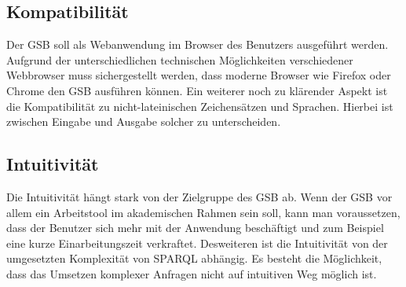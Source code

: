 \subsection{Kompatibilität}
Der GSB soll als Webanwendung im Browser des Benutzers ausgeführt werden. Aufgrund der unterschiedlichen technischen Möglichkeiten verschiedener Webbrowser muss sichergestellt werden, dass moderne Browser wie Firefox oder Chrome den GSB ausführen können.
Ein weiterer noch zu klärender Aspekt ist die Kompatibilität zu nicht-lateinischen Zeichensätzen und Sprachen. Hierbei ist zwischen Eingabe und Ausgabe solcher zu unterscheiden.

\subsection{Intuitivität}
Die Intuitivität hängt stark von der Zielgruppe des GSB ab. Wenn der GSB vor allem ein Arbeitstool im akademischen Rahmen sein soll, kann man voraussetzen, dass der Benutzer sich mehr mit der Anwendung beschäftigt und zum Beispiel eine kurze Einarbeitungszeit verkraftet. Desweiteren ist die Intuitivität von der umgesetzten Komplexität von SPARQL abhängig. Es besteht die Möglichkeit, dass das Umsetzen komplexer Anfragen nicht auf intuitiven Weg möglich ist.




